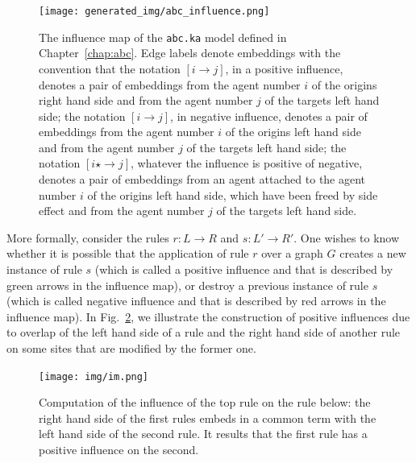 \documentclass[11pt]{book}
\def\ttt#1{\texttt{#1}}
\def\rar{\rightarrow}
\begin{document}
\begin{figure}[htbp] %
   \centering
   \texttt{[image: generated\_img/abc\_influence.png]}
   \caption{The influence map of the \ttt{abc.ka} model defined in Chapter~\ref{chap:abc}. Edge labels denote embeddings with the convention that
the notation $[i\rar j]$, in a positive influence, denotes a pair of embeddings from the agent number $i$ of the origin{\textquotesingle}s right hand side and from the agent number $j$ of the target{\textquotesingle}s left hand side;
the notation $[i\rar j]$, in negative influence,  denotes a pair of embeddings from the agent number $i$ of the origin{\textquotesingle}s left hand side and from the agent number $j$ of the target{\textquotesingle}s left hand side;
the notation $[i\star \rar j]$, whatever the influence is positive of negative,  denotes a pair of embeddings from an agent attached to the agent number $i$  of the origin{\textquotesingle}s left hand side, which have been freed by side effect  and   from the agent number $j$ of the target{\textquotesingle}s left hand side. }
   \label{fig:kasa-abc-im}
\end{figure}

More formally, consider the rules $r:L\rar R$ and $s:L'\rar R'$. One wishes to know whether it is possible that the application of rule $r$ over a graph $G$ creates a new instance of rule $s$ (which is called a positive influence and that is described by green arrows in the influence map), or destroy a previous instance of rule $s$ (which is called negative influence and that is described by red arrows in the influence map).
In Fig.~\ref{fig:imbis}, we illustrate the construction of positive influences due to overlap of the left hand side of a rule and the right hand side of another rule on some sites that are modified by the former one.

\begin{figure}[htbp] %
   \centering
\texttt{[image: img/im.png]}
   \caption{Computation of the influence of the top rule on the rule below: the right hand side of the first rules embeds in a common term with the left hand side of the second rule. It results that the first rule has a positive influence on the second.}
   \label{fig:imbis}
\end{figure}
\end{document}
